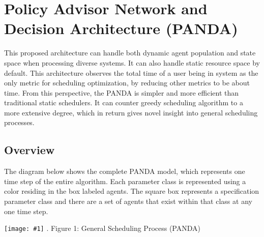 \documentclass{article}
\theoremstyle{definition}
\theoremstyle{remark}
\newcommand{\addpic}[1]{\texttt{[image: \#1]}}
\begin{document}
	\section{Policy Advisor Network and Decision Architecture (PANDA)}

	This proposed architecture can handle both dynamic agent population and state space when processing diverse systems. It can also handle static resource space by default. This architecture observes the total time of a user being in system as the only metric for scheduling optimization, by reducing other metrics to be about time. From this perspective, the PANDA is simpler and more efficient than traditional static schedulers. It can counter greedy scheduling algorithm to a more extensive degree, which in return gives novel insight into general scheduling processes.

		\subsection{Overview}

		The diagram below shows the complete PANDA model, which represents one time step of the entire algorithm. Each parameter class is represented using a color residing in the box labeled agents. The square box represents a specification parameter class and there are a set of agents that exist within that class at any one time step.
	
	 	  
	 	\addpic{figures/general_diagram}
	 	.\hspace{2cm}  Figure 1:  General Scheduling Process (PANDA)			 
		
\end{document}
